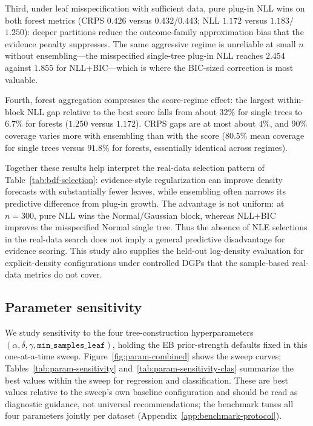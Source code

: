 Third, under leaf misspecification with sufficient data, pure plug-in NLL wins on both forest metrics (CRPS $0.426$ versus $0.432$/$0.443$; NLL $1.172$ versus $1.183$/$1.250$): deeper partitions reduce the outcome-family approximation bias that the evidence penalty suppresses. The same aggressive regime is unreliable at small $n$ without ensembling---the misspecified single-tree plug-in NLL reaches $2.454$ against $1.855$ for NLL+BIC---which is where the BIC-sized correction is most valuable.

Fourth, forest aggregation compresses the score-regime effect: the largest within-block NLL gap relative to the best score falls from about $32\%$ for single trees to $6.7\%$ for forests ($1.250$ versus $1.172$). CRPS gaps are at most about $4\%$, and 90\% coverage varies more with ensembling than with the score ($80.5\%$ mean coverage for single trees versus $91.8\%$ for forests, essentially identical across regimes).

Together these results help interpret the real-data selection pattern of Table~\ref{tab:bdf-selection}: evidence-style regularization can improve density forecasts with substantially fewer leaves, while ensembling often narrows its predictive difference from plug-in growth. The advantage is not uniform: at $n=300$, pure NLL wins the Normal/Gaussian block, whereas NLL+BIC improves the misspecified Normal single tree. Thus the absence of NLE selections in the real-data search does not imply a general predictive disadvantage for evidence scoring. This study also supplies the held-out log-density evaluation for explicit-density configurations under controlled DGPs that the sample-based real-data metrics do not cover.

\subsection{Parameter sensitivity}\label{app:additional-param-sensitivity}

We study sensitivity to the four tree-construction hyperparameters $(\alpha, \delta, \gamma, \texttt{min\_samples\_leaf})$, holding the EB prior-strength defaults fixed in this one-at-a-time sweep. Figure~\ref{fig:param-combined} shows the sweep curves; Tables~\ref{tab:param-sensitivity} and~\ref{tab:param-sensitivity-clas} summarize the best values within the sweep for regression and classification. These are best values relative to the sweep's own baseline configuration and should be read as diagnostic guidance, not universal recommendations; the benchmark tunes all four parameters jointly per dataset (Appendix~\ref{app:benchmark-protocol}).

